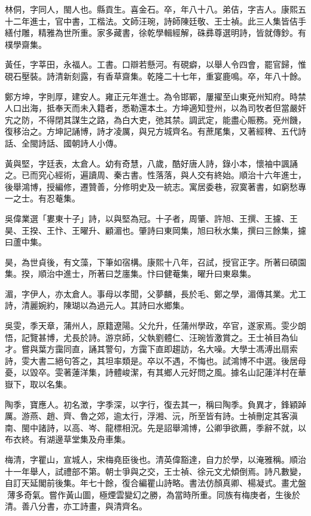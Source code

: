\begin{pinyinscope}
林侗，字同人，閩人也。縣貢生。喜金石。卒，年八十八。弟佶，字吉人。康熙五十二年進士，官中書，工楷法。文師汪琬，詩師陳廷敬、王士禎。此三人集皆佶手繕付雕，精雅為世所重。家多藏書，徐乾學輯經解，硃彞尊選明詩，皆就傳鈔。有樸學齋集。

黃任，字莘田，永福人。工書。口辯若懸河。有硯癖，以舉人令四會，罷官歸，惟硯石壓裝。詩清新刻露，有香草齋集。乾隆二十七年，重宴鹿鳴。卒，年八十餘。

鄭方坤，字則厚，建安人。雍正元年進士。為令邯鄲，屢擢至山東兗州知府。時禁人口出海，抵奉天而未入籍者，悉勒還本土。方坤適知登州，以為司牧者但當嚴奸宄之防，不得閉其謀生之路，為白大吏，弛其禁。調武定，能盡心賑務。兗州饑，復移治之。方坤記誦博，詩才凌厲，與兄方城齊名。有蔗尾集，又著經稗、五代詩話、全閩詩話、國朝詩人小傳。

黃與堅，字廷表，太倉人。幼有奇慧，八歲，酷好唐人詩，錄小本，懷袖中諷誦之。已而究心經術，遍讀周、秦古書。性落落，與人交有終始。順治十六年進士，後舉鴻博，授編修，遷贊善，分修明史及一統志。寓居委巷，寂寞著書，如窮愁專一之士。有忍菴集。

吳偉業選「婁東十子」詩，以與堅為冠。十子者，周肇、許旭、王撰、王攄、王昊、王揆、王忭、王曜升、顧湄也。肇詩曰東岡集，旭曰秋水集，撰曰三餘集，攄曰蘆中集。

昊，為世貞後，有文藻，下筆如宿構。康熙十八年，召試，授官正字。所著曰碩園集。揆，順治中進士，所著曰芝廛集。忭曰健菴集，曜升曰東皋集。

湄，字伊人，亦太倉人。事母以孝聞，父夢麟，長於毛、鄭之學，湄傳其業。尤工詩，清麗婉約，陳瑚以為過元人。其詩曰水鄉集。

吳雯，季天章，蒲州人，原籍遼陽。父允升，任蒲州學政，卒官，遂家焉。雯少朗悟，記覽甚博，尤長於詩。游京師，父執劉體仁、汪琬皆激賞之。王士禎目為仙才。嘗與葉方靄同直，誦其警句，方靄下直即趨訪，名大噪。大學士馮溥出扇索詩，雯大書二絕句答之，其坦率類是。卒以不遇，不悔也。試鴻博不中選。後居母憂，以毀卒。雯著蓮洋集，詩體峻潔，有其鄉人元好問之風。據名山記蓮洋村在華嶽下，取以名集。

陶季，寶應人。初名澂，字季深，以字行，復去其一，稱曰陶季。負異才，鋒穎踔厲。游燕、趙、齊、魯之郊，逾太行，浮湘、沅，所至皆有詩。士禎刪定其客滇南、閩中諸詩，以高、岑、龍標相況。先是詔舉鴻博，公卿爭欲薦，季辭不就，以布衣終。有湖邊草堂集及舟車集。

梅清，字瞿山，宣城人，宋梅堯臣後也。清英偉豁達，自力於學，以淹雅稱。順治十一年舉人，試禮部不第。朝士爭與之交，王士禎、徐元文尤傾倒焉。詩凡數變，自訂天延閣前後集。年七十餘，復合編瞿山詩略。書法仿顏真卿、楊凝式。畫尤盤薄多奇氣。嘗作黃山圖，極煙雲變幻之勝，為當時所重。同族有梅庚者，生後於清。善八分書，亦工詩畫，與清齊名。


\end{pinyinscope}
